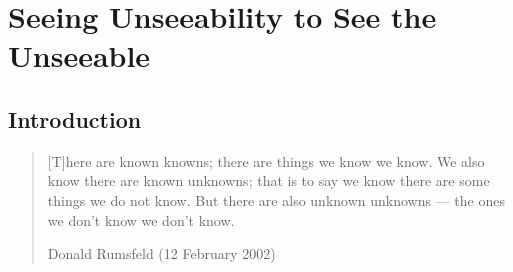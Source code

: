 \chapter{Seeing Unseeability to See the Unseeable}
\label{chapter:acs2012a}

\section{Introduction}
\label{sec-ll2:introduction}

\begin{quote}
  [T]here are known knowns; there are things we know we know.
  We also know there are known unknowns; that is to say we know there are some
  things we do not know.
  But there are also unknown unknowns --- the ones we don't know we don't know.
  \par\vspace*{-3ex}
  \begin{flushright}
    Donald Rumsfeld (12 February 2002)
  \end{flushright}
  \par\vspace*{-4ex}
\end{quote}

